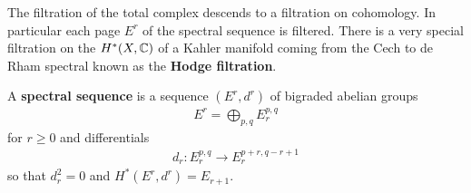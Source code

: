 \documentclass[12pt]{article}
\begin{document}
\hfill

The filtration of the total complex descends to a filtration on 
cohomology. In particular each page $E^r$ of the spectral sequence is
filtered. There is a very special filtration on the $H^*(X,\mathbb{C})$ of a Kahler manifold
coming from the Cech to de Rham spectral known as the \textbf{Hodge filtration}.
\begin{definition}
    A \textbf{spectral sequence} is a sequence $(E^r,d^r)$ of bigraded abelian groups \begin{align*}
        E^r = \bigoplus_{p,q} E^{p,q}_r
    \end{align*} for $r\geq 0$ and differentials \begin{align*}
        d_r: E^{p,q}_r \to E^{p+r,q-r+1}_r
    \end{align*} so that $d_r^2 = 0$ and $H^*(E^r,d^r) = E_{r+1}$.
\end{definition}
\end{document}
